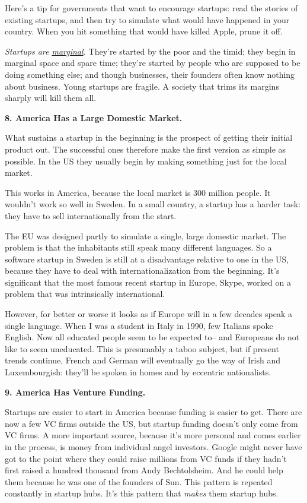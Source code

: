 \documentclass[12pt]{book}
\begin{document}
Here's a tip for governments that want to encourage startups: read the
stories of existing startups, and then try to simulate what would have
happened in your country. When you hit something that would have killed
Apple, prune it off.

\emph{Startups are \href{marginal.html}{marginal}.} They're started by
the poor and the timid; they begin in marginal space and spare time;
they're started by people who are supposed to be doing something else;
and though businesses, their founders often know nothing about business.
Young startups are fragile. A society that trims its margins sharply
will kill them all.

\textbf{8. America Has a Large Domestic Market.}

What sustains a startup in the beginning is the prospect of getting
their initial product out. The successful ones therefore make the first
version as simple as possible. In the US they usually begin by making
something just for the local market.

This works in America, because the local market is 300 million people.
It wouldn't work so well in Sweden. In a small country, a startup has a
harder task: they have to sell internationally from the start.

The EU was designed partly to simulate a single, large domestic market.
The problem is that the inhabitants still speak many different
languages. So a software startup in Sweden is still at a disadvantage
relative to one in the US, because they have to deal with
internationalization from the beginning. It's significant that the most
famous recent startup in Europe, Skype, worked on a problem that was
intrinsically international.

However, for better or worse it looks as if Europe will in a few decades
speak a single language. When I was a student in Italy in 1990, few
Italians spoke English. Now all educated people seem to be expected to--
and Europeans do not like to seem uneducated. This is presumably a taboo
subject, but if present trends continue, French and German will
eventually go the way of Irish and Luxembourgish: they'll be spoken in
homes and by eccentric nationalists.

\textbf{9. America Has Venture Funding.}

Startups are easier to start in America because funding is easier to
get. There are now a few VC firms outside the US, but startup funding
doesn't only come from VC firms. A more important source, because it's
more personal and comes earlier in the process, is money from individual
angel investors. Google might never have got to the point where they
could raise millions from VC funds if they hadn't first raised a hundred
thousand from Andy Bechtolsheim. And he could help them because he was
one of the founders of Sun. This pattern is repeated constantly in
startup hubs. It's this pattern that \emph{makes} them startup hubs.
\end{document}
